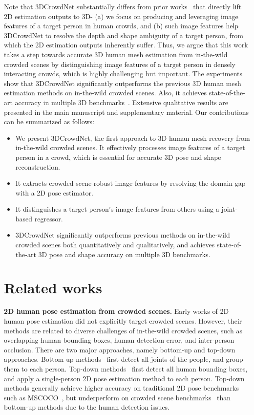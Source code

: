\documentclass[10pt,twocolumn,letterpaper]{article}
\begin{document}
Note that 3DCrowdNet substantially differs from prior works~\cite{martinez2017simple,choi2020p2m} that directly lift 2D estimation outputs to 3D- (a) we focus on producing and leveraging image features of a target person in human crowds, and
(b) such image features help 3DCrowdNet to resolve the depth and shape ambiguity of a target person, from which the 2D estimation outputs inherently suffer.
Thus, we argue that this work takes a step towards accurate 3D human mesh estimation from in-the-wild crowded scenes by distinguishing image features of a target person in densely interacting crowds, which is highly challenging but important.
The experiments show that 3DCrowdNet significantly outperforms the previous 3D human mesh estimation methods on in-the-wild crowded scenes.
Also, it achieves state-of-the-art accuracy in multiple 3D benchmarks~\cite{mehta2018single,joo2017panoptic,von20183dpw}.
Extensive qualitative results are presented in the main manuscript and supplementary material.
Our contributions can be summarized as follows:
\begin{itemize}
\item We present 3DCrowdNet, the first approach to 3D human mesh recovery from in-the-wild crowded scenes. 
It effectively processes image features of a target person in a crowd, which is essential for accurate 3D pose and shape reconstruction. 
\item It extracts crowded scene-robust image features by resolving the domain gap with a 2D pose estimator.
\item It distinguishes a target person's image features from others using a joint-based regressor.\item 3DCrowdNet significantly outperforms previous methods on in-the-wild crowded scenes both quantitatively and qualitatively, and achieves state-of-the-art 3D pose and shape accuracy on multiple 3D benchmarks.
\end{itemize}
 \section{Related works}

\noindent\textbf{2D human pose estimation from crowded scenes.}
Early works of 2D human pose estimation did not explicitly target crowded scenes. However, their methods are related to diverse challenges of in-the-wild crowded scenes, such as overlapping human bounding boxes, human detection error, and inter-person occlusion.
There are two major approaches, namely bottom-up and top-down approaches.
Bottom-up methods~\cite{pishchulin2016deepcut,cao2017realtime,newell2016associative} first detect all joints of the people, and group them to each person.
Top-down methods~\cite{he2017mask,papandreou2017towards,chen2018cascaded} first detect all human bounding boxes, and apply a single-person 2D pose estimation method to each person.
Top-down methods generally achieve higher accuracy on traditional 2D pose benchmarks such as MSCOCO~\cite{lin2014mscoco}, but underperform on crowded scene benchmarks~\cite{li2019crowdpose,zhang2019pose2seg} than bottom-up methods due to the human detection issues. 
\end{document}
